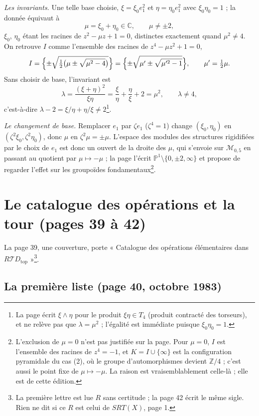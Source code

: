 \documentclass[11pt,a4paper]{article}
\begin{document}
\emph{Les invariants.} Une telle base choisie, $\xi = \xi_0 e_1^{2}$ et $\eta =
\eta_0 e_1^{2}$ avec $\xi_0 \eta_0 = 1$ ; la donnée équivaut à
\[
\mu = \xi_0 + \eta_0 \in \mathbb{C}, \qquad \mu \neq \pm 2,
\]
$\xi_0$, $\eta_0$ étant les racines de $z^2 - \mu z + 1 = 0$, distinctes
exactement quand $\mu^2 \neq 4$. On retrouve $I$ comme l'ensemble des racines de
$z^4 - \mu z^2 + 1 = 0$,
\[
I = \Bigl\{ \pm\sqrt{\tfrac{1}{2}\bigl(\mu \pm \sqrt{\mu^2 - 4}\bigr)} \Bigr\}
= \Bigl\{ \pm\sqrt{\mu' \pm \sqrt{\mu'^2 - 1}} \Bigr\}, \qquad \mu' =
\tfrac{1}{2}\mu .
\]
Sans choisir de base, l'invariant est
\[
\lambda = \frac{(\xi + \eta)^2}{\xi\eta} = \frac{\xi}{\eta} + \frac{\eta}{\xi} +
2 = \mu^2, \qquad \lambda \neq 4,
\]
c'est-à-dire $\lambda - 2 = \xi/\eta + \eta/\xi \neq 2$\footnote{La page écrit
$\xi \wedge \eta$ pour le produit $\xi\eta \in T_4$ (produit contracté des
torseurs), et ne relève pas que $\lambda = \mu^2$ ; l'égalité est immédiate
puisque $\xi_0\eta_0 = 1$.}.

\emph{Le changement de base.} Remplacer $e_1$ par $\zeta e_1$ ($\zeta^4 = 1$)
change $(\xi_0, \eta_0)$ en $(\zeta^2\xi_0, \zeta^2\eta_0)$, donc $\mu$ en
$\zeta^2\mu = \pm\mu$. L'espace des modules des structures rigidifiées par le
choix de $e_1$ est donc un ouvert de la droite des $\mu$, qui s'envoie sur
$\mathcal{M}_{0,5}$ en passant au quotient par $\mu \mapsto -\mu$ ; la page
l'écrit $\mathbb{P}^{1} \setminus \{0, \pm 2, \infty\}$ et propose de regarder
l'effet sur les groupoïdes fondamentaux\footnote{L'exclusion de $\mu = 0$ n'est
pas justifiée sur la page. Pour $\mu = 0$, $I$ est l'ensemble des racines de
$z^4 = -1$, et $K = I \cup \{\infty\}$ est la configuration pyramidale du cas
(2), où le groupe d'automorphismes devient $\mathbb{Z}/4$ ; c'est aussi le point
fixe de $\mu \mapsto -\mu$. La raison est vraisemblablement celle-là ; elle est
de cette édition.}.

\section*{Le catalogue des opérations et la tour (pages 39 à 42)}

La page 39, une couverture, porte « Catalogue des opérations élémentaires dans
$R\mathcal{T}D_{\mathrm{top}}$ »\footnote{La première lettre est lue $R$ sans
certitude ; la page 42 écrit le même sigle. Rien ne dit si ce $R$ est celui de
$SRT(X)$, page 1.}.

\subsection*{La première liste (page 40, octobre 1983)}
\end{document}

